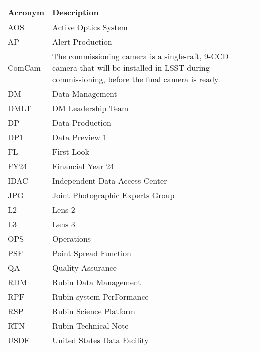 \addtocounter{table}{-1}
\begin{longtable}{p{}p{}}\hline
\textbf{Acronym} & \textbf{Description}  \\\hline

AOS & Active Optics System \\\hline
AP & Alert Production \\\hline
ComCam & The commissioning camera is a single-raft, 9-CCD camera that will be installed in LSST during commissioning, before the final camera is ready. \\\hline
DM & Data Management \\\hline
DMLT & DM Leadership Team \\\hline
DP & Data Production \\\hline
DP1 & Data Preview 1 \\\hline
FL & First Look \\\hline
FY24 & Financial Year 24 \\\hline
IDAC & Independent Data Access Center \\\hline
JPG & Joint Photographic Experts Group \\\hline
L2 & Lens 2 \\\hline
L3 & Lens 3 \\\hline
OPS & Operations \\\hline
PSF & Point Spread Function \\\hline
QA & Quality Assurance \\\hline
RDM & Rubin Data Management \\\hline
RPF & Rubin system PerFormance \\\hline
RSP & Rubin Science Platform \\\hline
RTN & Rubin Technical Note \\\hline
USDF & United States Data Facility \\\hline
\end{longtable}
